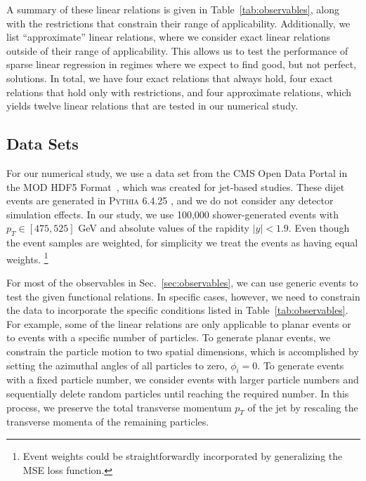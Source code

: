 \documentclass[aps,prd,twocolumn, superscriptaddress,preprintnumbers, nofootinbib,longbibliography,floatfix]{revtex4-2}
\DeclareRobustCommand{\Sec}[1]{Sec.~\ref{#1}}
\DeclareRobustCommand{\Tab}[1]{Table~\ref{#1}}
\begin{document}
A summary of these linear relations is given in \Tab{tab:observables}, along with the restrictions that constrain their range of applicability.
%
Additionally, we list ``approximate'' linear relations, where we consider exact linear relations outside of their range of applicability.
%
This allows us to test the performance of sparse linear regression in regimes where we expect to find good, but not perfect, solutions.
%
In total, we have four exact relations that always hold, four exact relations that hold only with restrictions, and four approximate relations, which yields twelve linear relations that are tested in our numerical study.




\subsection{Data Sets}
\label{sec:data}

For our numerical study, we use a data set from the CMS Open Data Portal \cite{OpenData2014, OpenData2016} in the MOD HDF5 Format~\cite{CMSOpenData}, which was created for jet-based studies.
%
These dijet events are generated in \textsc{Pythia} 6.4.25 \cite{Sjostrand:2006za}, and we do not consider any detector simulation effects.
%
In our study, we use 100,000 shower-generated events with $p_T \in [475, 525]$ GeV and absolute values of the rapidity $|y| < 1.9$.
%
Even though the event samples are weighted, for simplicity we treat the events as having equal weights.%
%
\footnote{Event weights could be straightforwardly incorporated by generalizing the MSE loss function.}


For most of the observables in \Sec{sec:observables}, we can use generic events to test the given functional relations.
%
In specific cases, however, we need to constrain the data to incorporate the specific conditions listed in \Tab{tab:observables}.
%
For example, some of the linear relations are only applicable to planar events or to events with a specific number of particles.
%
To generate planar events, we constrain the particle motion to two spatial dimensions, which is accomplished by setting the azimuthal angles of all particles to zero, $\phi_i = 0$.
%
To generate events with a fixed particle number, we consider events with larger particle numbers and sequentially delete random particles until reaching the required number.
%
In this process, we preserve the total transverse momentum $p_T$ of the jet by rescaling the transverse momenta of the remaining particles.
\end{document}
